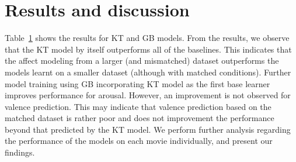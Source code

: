 \documentclass{article}
\begin{document}

\section{Results and discussion}
Table~\ref{} shows the results for KT and GB models.
From the results, we observe that the KT model by itself outperforms all of the baselines.
This indicates that the affect modeling from a larger (and mismatched) dataset outperforms the models learnt on a smaller dataset (although with matched conditions). 
Further model training using GB incorporating KT model as the first base learner improves performance for arousal. 
However, an improvement is not observed for valence prediction.
This may indicate that valence prediction based on the matched dataset is rather poor and does not improvement the performance beyond that predicted by the KT model.
We perform further analysis regarding the performance of the models on each movie individually, and present our findings. 
\end{document}
